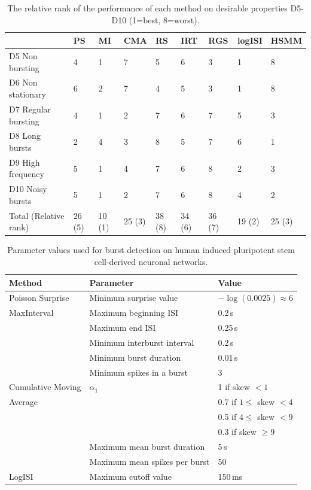 \documentclass[12pt, titlepage]{article}
\begin{document}
		\begin{table}
			\centering \begin{tabular}{|l|llllllll|}
				\hline
				& PS & MI & CMA & RS & IRT & RGS & logISI & HSMM
				\\ \hline \rowcolor{Gray} D5 Non bursting & 4 & 1 & 7 & 5 & 6 & 3 & 1 &  8
				\\D6 Non stationary & 6 & 2 & 7 & 4 & 5 & 3 & 1 & 8 
				\\ \rowcolor{Gray}D7 Regular bursting & 4 & 1 & 2 & 7 & 6 & 7 & 5 & 3
				\\ D8 Long bursts & 2 & 4 & 3 & 8 & 5 & 7 & 6 & 1
				\\ \rowcolor{Gray} D9 High frequency & 5 & 1 & 4 & 7 & 6 & 8 & 2 & 3
				\\ D10 Noisy bursts & 5 & 1 & 2 & 7 & 6 & 8 & 4 & 2
				\\ \hline  \rowcolor{Gray} Total (Relative rank) & 26 (5) & 10 (1) & 25 (3) & 38 (8) & 34 (6) & 36 (7) & 19 (2) & 25 (3)
				\\ \hline
			\end{tabular}
			\caption{The relative rank of the performance of each method on desirable properties D5-D10 (1=best, 8=worst).} \label{des_results2}
		\end{table}	
				\begin{table}[h]
					\centering
					\begin{tabular}{|l|l|l|}
						\hline
						Method & Parameter & Value
						\\ \hline 	
						\rowcolor{Gray} Poisson Surprise  & Minimum surprise value & $-\log(0.0025) \approx 6$\\ \hline 
						MaxInterval & Maximum beginning ISI & 0.2$\,$s
						\\ & Maximum end ISI & 0.25$\,$s
						\\ & Minimum interburst interval & 0.2$\,$s
						\\ & Minimum burst duration & 0.01$\,$s
						\\ & Minimum spikes in a burst & 3
						\\ \hline
						\rowcolor{Gray} Cumulative Moving & $\alpha_1$ & 1 if skew $<1$
						\\ \rowcolor{Gray} Average & &  0.7  if $1 \leq $ skew $<4$
						\\ \rowcolor{Gray} & & 0.5  if $4 \leq $ skew $<9$
						\\ \rowcolor{Gray} & & 0.3  if  skew $\geq 9$
						\\ \rowcolor{Gray} & Maximum mean burst duration & 5$\,$s
						\\ \rowcolor{Gray} & Maximum mean spikes per burst & 50
						\\ \hline 
							 LogISI & Maximum cutoff value & 150$\,$ms
								\\ \hline
							
					\end{tabular}
					\caption{Parameter values used for burst detection on human induced pluripotent stem cell-derived neuronal networks.}
					\label{param_vals_hum}
				\end{table}	
\end{document}
